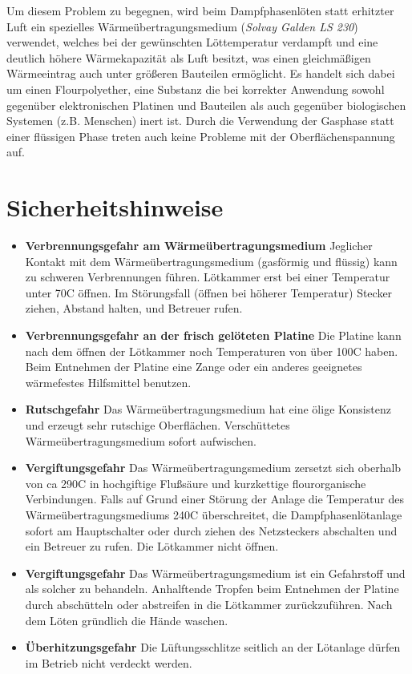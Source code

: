 \documentclass{\basedir/fablab-document}
\begin{document}
	Um diesem Problem zu begegnen, wird beim Dampfphasenl{\"o}ten statt erhitzter Luft ein spezielles W{\"a}rme{\"u}bertragungsmedium (\textit{Solvay Galden LS 230}) verwendet, welches bei der gew{\"u}nschten L{\"o}ttemperatur verdampft und eine deutlich h{\"o}here W{\"a}rmekapazit{\"a}t als Luft besitzt, was einen gleichm{\"a}{\ss}igen W{\"a}rmeeintrag auch unter gr{\"o}{\ss}eren Bauteilen erm{\"o}glicht. Es handelt sich dabei um einen Flourpolyether, eine Substanz die bei korrekter Anwendung sowohl gegen{\"u}ber elektronischen Platinen und Bauteilen als auch gegen{\"u}ber biologischen Systemen (z.B. Menschen) inert ist. Durch die Verwendung der Gasphase statt einer fl{\"u}ssigen Phase treten auch keine Probleme mit der Oberfl{\"a}chenspannung auf.
	
	\section{Sicherheitshinweise}
	
	\begin{itemize}
	
	\item \textbf{Verbrennungsgefahr am Wärmeübertragungsmedium} Jeglicher Kontakt mit dem Wärmeübertragungsmedium (gasförmig und flüssig) kann zu schweren Verbrennungen führen. Lötkammer erst bei einer Temperatur unter 70\textdegree C öffnen. Im Störungsfall (öffnen bei höherer Temperatur) Stecker ziehen, Abstand halten, und Betreuer rufen.

	\item \textbf{Verbrennungsgefahr an der frisch gelöteten Platine} Die Platine kann nach dem {\"o}ffnen der L{\"o}tkammer noch Temperaturen von {\"u}ber 100\textdegree C haben. Beim Entnehmen der Platine eine Zange oder ein anderes geeignetes w{\"a}rmefestes Hilfsmittel benutzen.
	\item \textbf{Rutschgefahr} Das W{\"a}rme{\"u}bertragungsmedium hat eine {\"o}lige Konsistenz und erzeugt sehr rutschige Oberfl{\"a}chen. Verschüttetes Wärmeübertragungsmedium sofort aufwischen.
	\item \textbf{Vergiftungsgefahr} Das W{\"a}rme{\"u}bertragungsmedium zersetzt sich oberhalb von ca 290\textdegree C in hochgiftige Flu{\ss}s{\"a}ure und kurzkettige flourorganische Verbindungen. Falls auf Grund einer Störung der Anlage die Temperatur des W{\"a}rme{\"u}bertragungsmediums 240\textdegree C {\"u}berschreitet, die Dampfphasenl{\"o}tanlage sofort am Hauptschalter oder durch ziehen des Netzsteckers abschalten und ein Betreuer zu rufen. Die L{\"o}tkammer nicht {\"o}ffnen.
	\item \textbf{Vergiftungsgefahr} Das W{\"a}rme{\"u}bertragungsmedium ist ein Gefahrstoff und als solcher zu behandeln. Anhalftende Tropfen beim Entnehmen der Platine durch absch{\"u}tteln oder abstreifen in die L{\"o}tkammer zur{\"u}ckzuf{\"u}hren. Nach dem L{\"o}ten gr{\"u}ndlich die H{\"a}nde waschen.
	\item \textbf{Überhitzungsgefahr} Die Lüftungsschlitze seitlich an der Lötanlage dürfen im Betrieb nicht verdeckt werden.
	\end{itemize}
	
\end{document}
